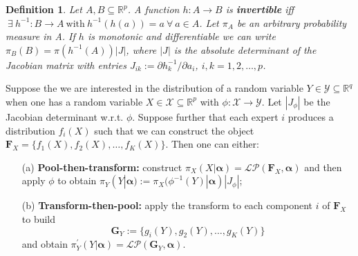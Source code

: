 \documentclass[a4paper, notitlepage, 10pt]{article}
\newtheorem{definition}{Definition}[]
\begin{document}

\begin{definition}
Let $A, B \subseteq \mathbb{R}^p$.
A function  $h: A \to B$ is \textbf{invertible} iff $\: \exists \: h^{-1}: B \to A \: \text{with} \: h^{-1}(h(a)) = a \: \forall \: a \in A$. 
Let $\pi_A$ be an arbitrary probability measure in A. 
If $h$ is monotonic and differentiable we can write $\pi_B(B) = \pi(h^{-1}(A))|J|$, where $|J|$ is the absolute determinant of the Jacobian matrix with entries $J_{ik} := \partial h_k^{-1}/\partial a_i$, $i,k = 1, 2, \ldots, p$.
\end{definition}

Suppose the we are interested in the distribution of a random variable $Y \in \mathcal{Y}\subseteq \mathbb{R}^q$  when one has a random variable $X \in \mathcal{X} \subseteq \mathbb{R}^p$ with $\phi : \mathcal{X} \to \mathcal{Y}$.
Let $|J_\phi|$ be the Jacobian determinant w.r.t. $\phi$.
Suppose further that each expert $i$ produces a distribution $f_i(X)$ such that we can construct the object $\mathbf{F}_X = \{f_1(X), f_2(X), \ldots, f_K(X) \}$.
Then one can either:
\begin{itemize}
 \item[(a)] \textbf{Pool-then-transform:} construct $\pi_X(X | \boldsymbol \alpha) = \mathcal{LP}(\mathbf{F}_X, \boldsymbol \alpha)$ and then apply $\phi$ to obtain $\pi_Y(Y | \boldsymbol \alpha) := \pi_X( \phi^{-1}(Y)| \boldsymbol\alpha) |J_\phi|$;
 \item[(b)] \textbf{Transform-then-pool:} apply the transform to each component $i$ of $\mathbf{F}_X$ to build
 \[\mathbf{G}_{Y}:= \{g_i(Y), g_2(Y), \ldots, g_K(Y)\} \]
 and obtain $\pi_Y^{\prime}(Y |  \boldsymbol \alpha) = \mathcal{LP}(\mathbf{G}_{Y},  \boldsymbol \alpha)$.
\end{itemize}
\end{document}
